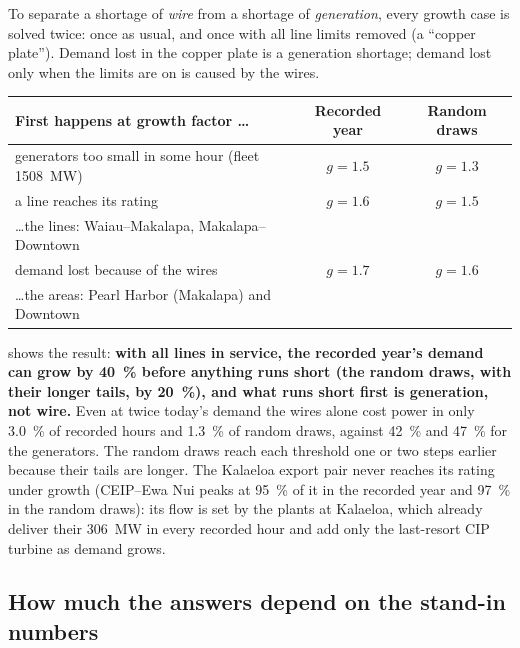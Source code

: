\documentclass[11pt,a4paper]{article}
\begin{document}
To separate a shortage of \emph{wire} from a shortage of \emph{generation}, every
growth case is solved twice: once as usual, and once with all line limits removed (a
``copper plate''). Demand lost in the copper plate is a generation shortage; demand
lost only when the limits are on is caused by the wires.

\begin{center}
\small
\begin{tabular}{@{}lcc@{}}
\toprule
\textbf{First happens at growth factor \dots} & \textbf{Recorded year} & \textbf{Random draws} \\
\midrule
generators too small in some hour (fleet \SI{1508}{MW})    & $g = 1.5$ & $g = 1.3$ \\
a line reaches its rating                                 & $g = 1.6$ & $g = 1.5$ \\
\quad \dots the lines: Waiau--Makalapa, Makalapa--Downtown & & \\
demand lost because of the wires                          & $g = 1.7$ & $g = 1.6$ \\
\quad \dots the areas: Pearl Harbor (Makalapa) and Downtown & & \\
\bottomrule
\end{tabular}
\end{center}

 shows the result: \textbf{with all lines in service, the recorded
year's demand can grow by \SI{40}{\percent} before anything runs short (the random
draws, with their longer tails, by \SI{20}{\percent}), and what runs short first is
generation, not wire.} Even at twice today's demand the wires alone cost
power in only \SI{3.0}{\percent} of recorded hours and \SI{1.3}{\percent} of random
draws, against \SI{42}{\percent} and \SI{47}{\percent} for the generators. The random
draws reach each threshold one or two steps earlier because their tails are longer. The Kalaeloa export pair
never reaches its rating under growth (CEIP--Ewa Nui peaks at \SI{95}{\percent} of it
in the recorded year and \SI{97}{\percent} in the random draws): its flow is set by the plants at Kalaeloa, which already deliver their
\SI{306}{MW} in every recorded hour and add only the last-resort CIP turbine as demand
grows.

\subsection{How much the answers depend on the stand-in numbers}
\label{sec:sens}
\end{document}

